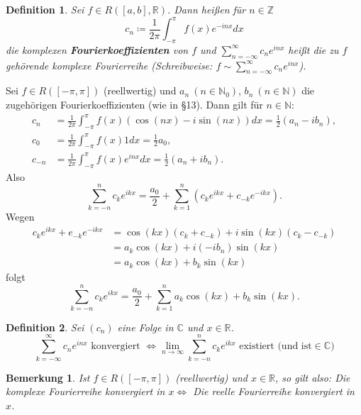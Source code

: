 \documentclass[12pt]{extreport} %
\newcommand{\C}{\mathbb{C}}
\newcommand{\N}{\mathbb{N}}
\newcommand{\R}{\mathbb{R}}
\newcommand{\Z}{\mathbb{Z}}
\theoremstyle{named}
\theoremstyle{nnamed}
\theoremstyle{itshape}
\newtheorem*{definition}{Definition}
\theoremstyle{normal}
\newtheorem*{bemerkung}{Bemerkung}
\begin{document}
\begin{definition}
	Sei $f \in R\left([a, b], \R \right)$. Dann hei{\ss}en für $n \in \Z$
		$$ c_{n} \coloneqq \frac{1}{2\pi} \int_{-\pi}^{\pi} f(x) e^{-inx} dx $$
	die komplexen \textbf{Fourierkoeffizienten} von $f$ und $\sum_{n=-\infty}^{\infty} c_{n} e^{inx}$ hei{\ss}t die zu $f$ gehörende komplexe Fourierreihe (Schreibweise: $f \sim \sum_{n=-\infty}^{\infty} c_{n} e^{inx}$).
\end{definition}
	
	Sei $f \in R\left([-\pi, \pi]\right)$ (reellwertig) und $a_{n} ~(n \in \N_{0})$, $b_{n} ~(n \in \N)$ die zugehörigen Fourierkoeffizienten (wie in \S13). Dann gilt für $n \in \N$:
	\begin{align*}
		c_{n} & = \frac{1}{2\pi} \int_{-\pi}^{\pi} f(x) \left( \cos(nx) - i \sin(nx) \right) dx = \frac{1}{2} \left( a_{n} - i b_{n} \right), \\
		c_{0} & = \frac{1}{2\pi} \int_{-\pi}^{\pi} f(x) 1 dx = \frac{1}{2} a_{0}, \\
		c_{-n} & = \frac{1}{2\pi} \int_{-\pi}^{\pi} f(x) e^{inx} dx = \frac{1}{2} \left( a_{n} + i b_{n} \right).
	\end{align*} 
	Also 
	$$ \sum_{k=-n}^{n} c_{k} e^{ikx} = \frac{a_{0}}{2} + \sum_{k=1}^{n} \left( c_{k} e^{ikx} + c_{-k} e^{-ikx} \right). $$ 
	Wegen
	\begin{align*}
		c_{k} e^{ikx} + e_{-k} e^{-ikx} & = \cos(kx) \left( c_{k} + c_{-k} \right) + i \sin(kx) \left( c_{k} - c_{-k} \right) \\
		& = a_{k} \cos(kx) + i (-i b_{n}) \sin(kx) \\
		& = a_{k} \cos(kx) + b_{k} \sin(kx)
	\end{align*}
	folgt
	$$ \sum_{k=-n}^{n} c_{k} e^{ikx} = \frac{a_{0}}{2} + \sum_{k=1}^{n} a_{k} \cos(kx) + b_{k} \sin(kx). $$

\begin{definition}
	Sei $(c_{n})$ eine Folge in $\C$ und $x \in \R$.
		$$ \sum_{k=-\infty}^{\infty} c_{n} e^{inx} \text{ konvergiert } \iff \lim_{n \rightarrow \infty} \sum_{k=-n}^{n} c_{k} e^{ikx} \text{ existiert (und ist} \in \C) $$
\end{definition}


\begin{bemerkung}
	Ist $f \in R\left([-\pi, \pi]\right)$ (reellwertig) und $x \in \R$, so gilt also: Die komplexe Fourierreihe konvergiert in $x \iff$ Die reelle Fourierreihe konvergiert in $x$.	
\end{bemerkung}
\end{document}
